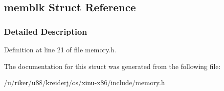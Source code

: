 \hypertarget{structmemblk}{}\subsection{memblk Struct Reference}
\label{structmemblk}


\subsubsection{Detailed Description}


Definition at line 21 of file memory.\+h.



The documentation for this struct was generated from the following file\+:\begin{DoxyCompactItemize}
\item 
/u/riker/u88/kreiderj/os/xinu-\/x86/include/memory.\+h\end{DoxyCompactItemize}
